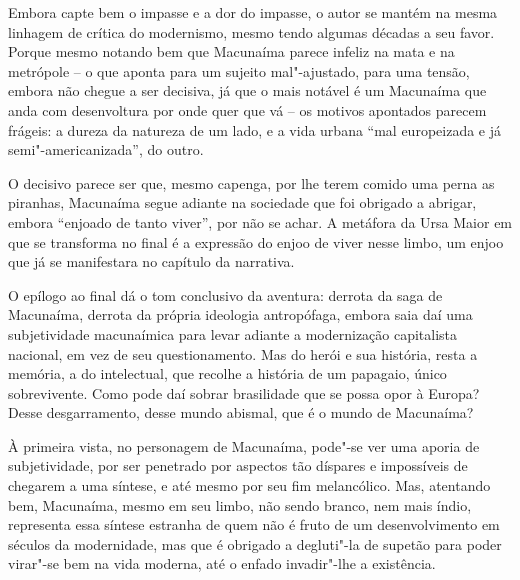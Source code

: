 Embora capte bem o impasse e a dor do impasse, o autor se mantém na
mesma linhagem de crítica do modernismo, mesmo tendo algumas décadas a
seu favor. Porque mesmo notando bem que Macunaíma parece infeliz na mata
e na metrópole -- o que aponta para um sujeito mal"-ajustado, para uma
tensão, embora não chegue a ser decisiva, já que o mais notável é um
Macunaíma que anda com desenvoltura por onde quer que vá -- os motivos
apontados parecem frágeis: a dureza da natureza de um lado, e a vida
urbana ``mal europeizada e já semi"-americanizada'', do outro.

O decisivo parece ser que, mesmo capenga, por lhe terem comido uma perna
as piranhas, Macunaíma segue adiante na sociedade que foi obrigado a
abrigar, embora ``enjoado de tanto viver'', por não se achar. A metáfora
da Ursa Maior em que se transforma no final é a expressão do enjoo de
viver nesse limbo, um enjoo que já se manifestara no capítulo  da
narrativa.

O epílogo ao final dá o tom conclusivo da aventura: derrota da saga de
Macunaíma, derrota da própria ideologia antropófaga, embora saia daí uma
subjetividade macunaímica para levar adiante a modernização capitalista
nacional, em vez de seu questionamento. Mas do herói e sua história,
resta a memória, a do intelectual, que recolhe a história de um
papagaio, único sobrevivente. Como pode daí sobrar brasilidade que se
possa opor à Europa? Desse desgarramento, desse mundo abismal, que é o
mundo de Macunaíma?

À primeira vista, no personagem de Macunaíma, pode"-se ver uma aporia de
subjetividade, por ser penetrado por aspectos tão díspares e impossíveis
de chegarem a uma síntese, e até mesmo por seu fim melancólico. Mas,
atentando bem, Macunaíma, mesmo em seu limbo, não sendo branco, nem mais
índio, representa essa síntese estranha de quem não é fruto de um
desenvolvimento em séculos da modernidade, mas que é obrigado a
degluti"-la de supetão para poder virar"-se bem na vida moderna, até o
enfado invadir"-lhe a existência.

